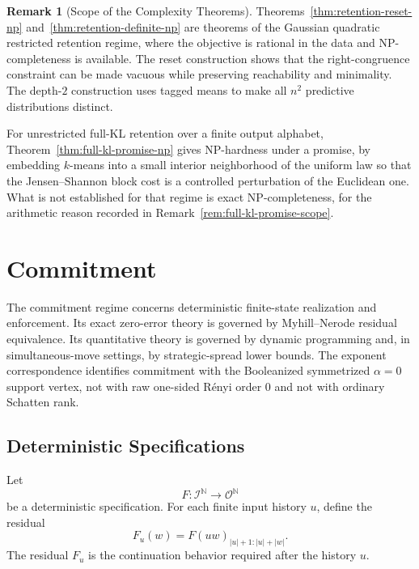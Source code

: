 \documentclass[12pt]{article}
\theoremstyle{definition}
\newtheorem{remark}[theorem]{Remark}
\begin{document}
\begin{remark}[Scope of the Complexity Theorems]
\label{rem:complexity-scope}
Theorems~\ref{thm:retention-reset-np}
and~\ref{thm:retention-definite-np} are theorems of the Gaussian quadratic
restricted retention regime, where the objective is rational in the data and
NP-completeness is available.  The reset construction shows that the
right-congruence constraint can be made vacuous while preserving reachability
and minimality.  The depth-$2$ construction uses tagged means to make all
$n^2$ predictive distributions distinct.

For unrestricted full-KL retention over a finite output alphabet,
Theorem~\ref{thm:full-kl-promise-np} gives NP-hardness under a promise, by
embedding $k$-means into a small interior neighborhood of the uniform law so
that the Jensen--Shannon block cost is a controlled perturbation of the
Euclidean one.  What is not established for that regime is exact
NP-completeness, for the arithmetic reason recorded in
Remark~\ref{rem:full-kl-promise-scope}.
\end{remark}

\section{Commitment}
\label{sec:commitment}

The commitment regime concerns deterministic finite-state realization and
enforcement.  Its exact zero-error theory is governed by Myhill--Nerode
residual equivalence.  Its quantitative theory is governed by dynamic
programming and, in simultaneous-move settings, by strategic-spread lower
bounds.  The exponent correspondence identifies commitment with the
Booleanized symmetrized $\alpha=0$ support vertex, not with raw one-sided
R\'enyi order $0$ and not with ordinary Schatten rank.

\subsection{Deterministic Specifications}
\label{subsec:det-spec}

Let
\[
F:\mathcal I^{\mathbb N}\to\mathcal O^{\mathbb N}
\]
be a deterministic specification.  For each finite input history $u$, define
the residual
\[
F_u(w)=F(uw)_{|u|+1:|u|+|w|}.
\]
The residual $F_u$ is the continuation behavior required after the history $u$.
\end{document}
